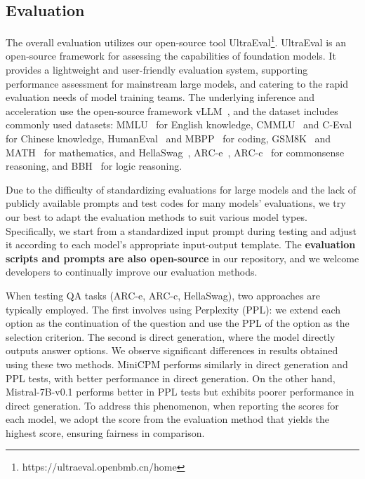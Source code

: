 \documentclass[dvipsnames]{article}
\begin{document}
\subsection{Evaluation}
\label{sec:evaluation}
The overall evaluation utilizes our open-source tool UltraEval\footnote{https://ultraeval.openbmb.cn/home}. UltraEval is an open-source framework for assessing the capabilities of foundation models. It provides a lightweight and user-friendly evaluation system, supporting performance assessment for mainstream large models, and catering to the rapid evaluation needs of model training teams. The underlying inference and acceleration use the open-source framework vLLM~\citep{kwon2023efficient}, and the dataset includes commonly used datasets: MMLU~\citep{hendrycks2020measuring} for English knowledge, CMMLU~\citep{li2024cmmlu} and C-Eval~\citep{huang2024c} for Chinese knowledge, HumanEval~\citep{chen2021evaluating} and MBPP~\citep{austin2021program} for coding, GSM8K~\citep{cobbe2021training} and MATH~\citep{hendrycks2021measuring} for mathematics, and HellaSwag~\citep{zellers2019hellaswag}, ARC-e~\citep{clark2018think}, ARC-c~\citep{clark2018think} for commonsense reasoning, and BBH~\citep{suzgun2022challenging} for logic reasoning. 

Due to the difficulty of standardizing evaluations for large models and the lack of publicly available prompts and test codes for many models' evaluations, we try our best to adapt the evaluation methods to suit various model types. Specifically, we start from a standardized input prompt during testing and adjust it according to each model's appropriate input-output template. The \textbf{evaluation scripts and prompts are also open-source} in our repository, and we welcome developers to continually improve our evaluation methods.

When testing QA tasks (ARC-e, ARC-c, HellaSwag), two approaches are typically employed. The first involves using Perplexity (PPL): we extend each option as the continuation of the question and use the PPL of the option as the selection criterion. The second is direct generation, where the model directly outputs answer options. We observe significant differences in results obtained using these two methods.  MiniCPM performs similarly in direct generation and PPL tests, with better performance in direct generation. On the other hand, Mistral-7B-v0.1 performs better in PPL tests but exhibits poorer performance in direct generation. To address this phenomenon, when reporting the scores for each model, we adopt the score from the evaluation method that yields the highest score, ensuring fairness in comparison.
\end{document}
